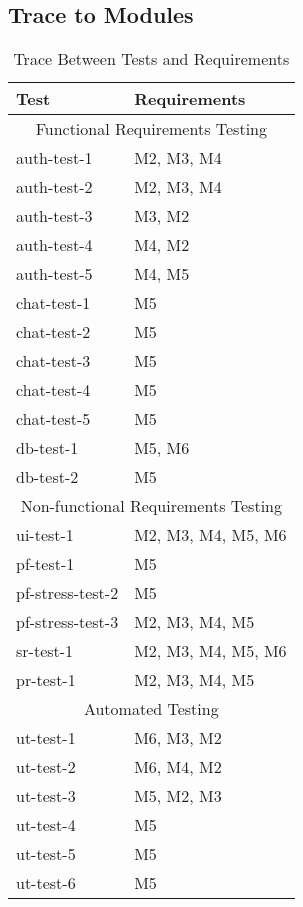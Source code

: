 \documentclass[12pt, titlepage]{article}
\begin{document}
				
\begin{center}
	\begin{table}[!htbp]
		\section{Trace to Modules}
\begin{tabularx}{\textwidth}{p{3cm}X}
				\toprule
				Test & Requirements \\
				\midrule
				\multicolumn{2}{c}{Functional Requirements Testing} \\
				\midrule
				auth-test-1 & M2, M3, M4\\
                auth-test-2 & M2, M3, M4 \\
                auth-test-3 & M3, M2\\
                auth-test-4 & M4, M2\\
                auth-test-5 & M4, M5\\
                chat-test-1 & M5\\
                chat-test-2 & M5\\
                chat-test-3 & M5\\
                chat-test-4 & M5\\
                chat-test-5 & M5\\
                db-test-1 & M5, M6\\
                db-test-2 & M5\\
				\midrule
				\multicolumn{2}{c}{Non-functional Requirements Testing} \\
				\midrule
                ui-test-1 & M2, M3, M4, M5, M6\\
                pf-test-1 & M5\\
                pf-stress-test-2 & M5\\
                pf-stress-test-3 & M2, M3, M4, M5\\
                sr-test-1 & M2, M3, M4, M5, M6\\
                pr-test-1 & M2, M3, M4, M5\\
				\midrule
				\multicolumn{2}{c}{Automated Testing} \\
				\midrule
				ut-test-1 & M6, M3, M2\\ %
				ut-test-2 & M6, M4, M2\\ %
				ut-test-3 & M5, M2, M3\\ %
				ut-test-4 & M5\\ %
				ut-test-5 & M5\\ %
				ut-test-6 & M5\\ %
				\bottomrule
			\end{tabularx}
			\caption{Trace Between Tests and Requirements}
			\makeatletter
			\def\rulecolor#1#{\CT@arc{#1}}
			\def\CT@arc#1#2{%
				\ifdim\baselineskip=\z@\noalign\fi
				{\gdef\CT@arc@{\color#1{#2}}}}
			\let\CT@arc@\relax
			\makeatother
			\label{Table}
		\end{table}
\end{center}
		
\end{document}
